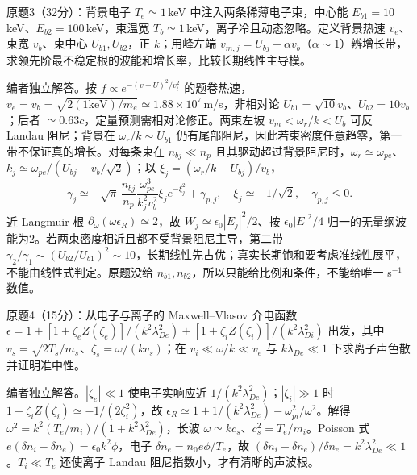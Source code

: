 \begin{exercise}\label{ex:hist02-final-3}
原题3（32分）：背景电子 $T_e\simeq1\,$keV 中注入两条稀薄电子束，中心能 $E_{b1}=10\,$keV、$E_{b2}=100\,$keV，束温宽 $T_b\simeq1\,$keV，离子冷且动态忽略。定义背景热速 $v_e$、束宽 $v_b$、束中心 $U_{b1},U_{b2}$，正 $k$；用峰左端 $v_{m,j}=U_{bj}-\alpha v_b$（$\alpha\sim1$）辨增长带，求领先阶最不稳定根的波能和增长率，比较长期线性主导模。
\end{exercise}
\begin{solution}
编者独立解答。按 $f\propto e^{-(v-U)^2/v_t^2}$ 的题卷热速，$v_e=v_b=\sqrt{2(1\mathrm{keV})/m_e}\simeq1.88\times10^7\,$m/s，非相对论 $U_{b1}=\sqrt{10}v_b$、$U_{b2}=10v_b$；后者 $\simeq0.63c$，定量预测需相对论修正。两束左坡 $v_m<\omega_r/k<U_b$ 可反 Landau 阻尼；背景在 $\omega_r/k\sim U_{b1}$ 仍有尾部阻尼，因此若束密度任意趋零，第一带不保证真的增长。对每条束在 $n_{bj}\ll n_p$ 且其驱动超过背景阻尼时，$\omega_r\simeq\omega_{pe}$、$k_j\simeq\omega_{pe}/(U_{bj}-v_b/\sqrt2)$；以 $\xi_j=(\omega_r/k-U_{bj})/v_b$，
\begin{equation}\gamma_j\simeq-\sqrt\pi\,\frac{n_{bj}}{n_p}\frac{\omega_{pe}^3}{k_j^2v_b^2}\xi_j e^{-\xi_j^2}+\gamma_{p,j},\quad \xi_j\simeq-1/\sqrt2,\quad \gamma_{p,j}\le0.
\end{equation}
近 Langmuir 根 $\partial_\omega(\omega\epsilon_R)\simeq2$，故 $W_j\simeq\epsilon_0|E_j|^2/2$、按 $\epsilon_0|E|^2/4$ 归一的无量纲波能为2。若两束密度相近且都不受背景阻尼主导，第二带 $\gamma_2/\gamma_1\sim(U_{b2}/U_{b1})^2\sim10$，长期线性先占优；真实长期饱和要考虑准线性展平，不能由线性式判定。原题没给 $n_{b1},n_{b2}$，所以只能给比例和条件，不能给唯一 s$^{-1}$ 数值。
\end{solution}

\begin{exercise}\label{ex:hist02-final-4}
原题4（15分）：从电子与离子的 Maxwell--Vlasov 介电函数 $\epsilon=1+[1+\zeta_eZ(\zeta_e)]/(k^2\lambda_{De}^2)+[1+\zeta_iZ(\zeta_i)]/(k^2\lambda_{Di}^2)$ 出发，其中 $v_s=\sqrt{2T_s/m_s}$、$\zeta_s=\omega/(kv_s)$；在 $v_i\ll\omega/k\ll v_e$ 与 $k\lambda_{De}\ll1$ 下求离子声色散并证明准中性。
\end{exercise}
\begin{solution}
编者独立解答。$|\zeta_e|\ll1$ 使电子实响应近 $1/(k^2\lambda_{De}^2)$；$|\zeta_i|\gg1$ 时 $1+\zeta_iZ(\zeta_i)\simeq-1/(2\zeta_i^2)$，故 $\epsilon_R\simeq1+1/(k^2\lambda_{De}^2)-\omega_{pi}^2/\omega^2$。解得 $\omega^2=k^2(T_e/m_i)/(1+k^2\lambda_{De}^2)$，长波 $\omega\simeq kc_s$、$c_s^2=T_e/m_i$。Poisson 式 $e(\delta n_i-\delta n_e)=\epsilon_0k^2\phi$，电子 $\delta n_e=n_0e\phi/T_e$，故 $(\delta n_i-\delta n_e)/\delta n_e=k^2\lambda_{De}^2\ll1$。$T_i\ll T_e$ 还使离子 Landau 阻尼指数小，才有清晰的声波根。
\end{solution}

